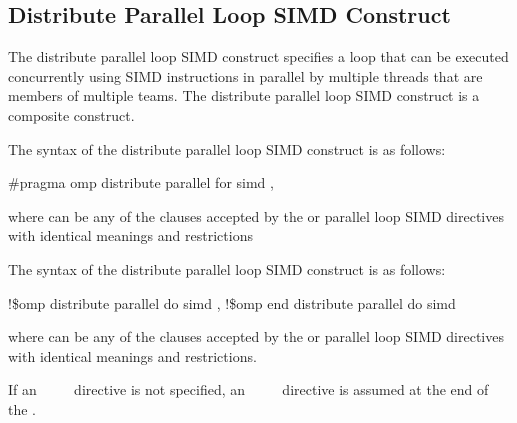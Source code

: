 \vspace{-24pt}

\subsection{Distribute Parallel Loop SIMD Construct}
\label{subsec:Distribute Parallel Loop SIMD Construct}
\summary
The distribute parallel loop SIMD construct specifies a loop that can be executed 
concurrently using SIMD instructions in parallel by multiple threads that are members 
of multiple teams. The distribute parallel loop SIMD construct is a composite construct.

\syntax
\begin{ccppspecific}
The syntax of the distribute parallel loop SIMD construct is as follows:

\begin{boxedcode}
\#pragma omp distribute parallel for simd \plc{[clause[ [},\plc{] clause] ... ] newline}
\end{boxedcode}

where  can be any of the clauses accepted by the  or parallel loop 
SIMD directives with identical meanings and restrictions
\end{ccppspecific}

\begin{fortranspecific}
The syntax of the distribute parallel loop SIMD construct is as follows:

\begin{boxedcode}
!\$omp distribute parallel do simd \plc{[clause[ [},\plc{] clause] ... ]}
\plc{[}!\$omp end distribute parallel do simd\plc{]}
\end{boxedcode}

where  can be any of the clauses accepted by the  or parallel loop 
SIMD directives with identical meanings and restrictions.

If an ~~~~ directive is not specified, an 
~~~~ directive is assumed at the end of the .
\end{fortranspecific}

